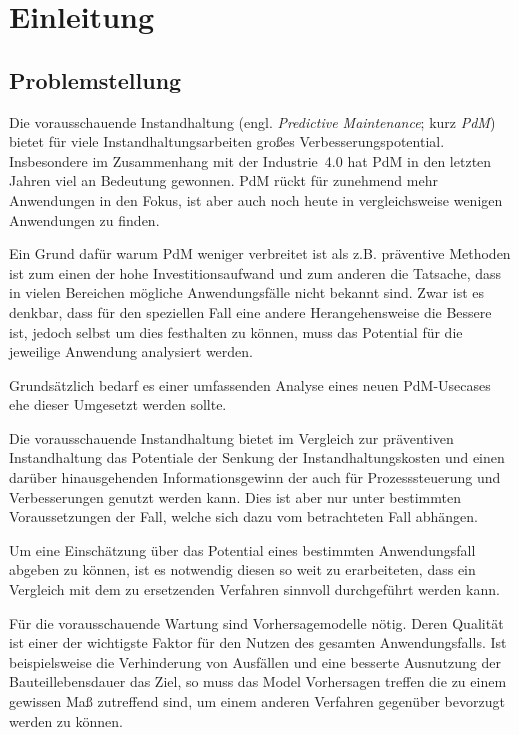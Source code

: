 \chapter{Einleitung}
\label{ch:einleitung}

\section{Problemstellung}
\label{sec:motivation}
Die vorausschauende Instandhaltung (engl. \textit{Predictive Maintenance}; kurz \textit{PdM}) bietet für viele Instandhaltungsarbeiten großes Verbesserungspotential. Insbesondere im Zusammenhang mit der Industrie~{4.0} hat PdM in den letzten Jahren viel an Bedeutung gewonnen. PdM rückt für zunehmend mehr Anwendungen in den Fokus, ist aber auch noch heute in vergleichsweise wenigen Anwendungen zu finden. 

Ein Grund dafür warum PdM weniger verbreitet ist als z.B. präventive Methoden ist zum einen der hohe Investitionsaufwand und zum anderen die Tatsache, dass in vielen Bereichen mögliche Anwendungsfälle nicht bekannt sind. Zwar ist es denkbar, dass für den speziellen Fall eine andere Herangehensweise die Bessere ist, jedoch selbst um dies festhalten zu können, muss das Potential für die jeweilige Anwendung analysiert werden. 

Grundsätzlich bedarf es einer umfassenden Analyse eines neuen PdM-Usecases ehe dieser Umgesetzt werden sollte.

Die vorausschauende Instandhaltung bietet im Vergleich zur präventiven Instandhaltung das Potentiale der Senkung der Instandhaltungskosten und einen darüber hinausgehenden Informationsgewinn der auch für Prozesssteuerung und Verbesserungen genutzt werden kann. Dies ist aber nur unter bestimmten Voraussetzungen der Fall, welche sich dazu vom betrachteten Fall abhängen.

Um eine Einschätzung über das Potential eines bestimmten Anwendungsfall abgeben zu können, ist es notwendig diesen so weit zu erarbeiteten, dass ein Vergleich mit dem zu ersetzenden Verfahren sinnvoll durchgeführt werden kann.

Für die vorausschauende Wartung sind Vorhersagemodelle nötig. Deren Qualität ist einer der wichtigste Faktor für den Nutzen des gesamten Anwendungsfalls. Ist beispielsweise die Verhinderung von Ausfällen und eine besserte Ausnutzung der Bauteillebensdauer das Ziel, so muss das Model Vorhersagen treffen die zu einem gewissen Maß zutreffend sind, um einem anderen Verfahren gegenüber bevorzugt werden zu können.

